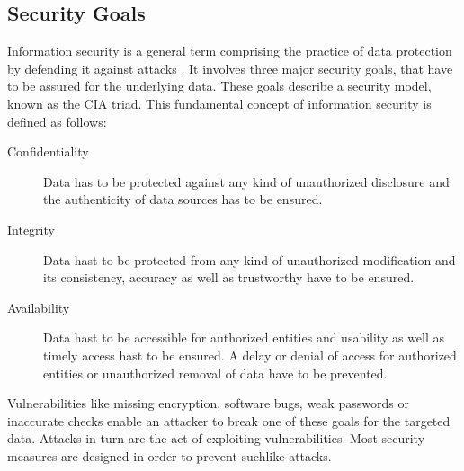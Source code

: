 \subsection{Security Goals}
Information security is a general term comprising the practice of data protection by defending it against attacks \cite{olivier2002database,Perrin:2008}. It involves three major security goals, that have to be assured for the underlying data. These goals describe a security model, known as the CIA triad. This fundamental concept of information security is defined as follows:

\begin{description}
\item [Confidentiality] Data has to be protected against any kind of unauthorized disclosure and the authenticity of data sources has to be ensured.
\item [Integrity] Data hast to be protected from any kind of unauthorized modification and its consistency, accuracy as well as trustworthy have to be ensured.
\item [Availability] Data hast to be accessible for authorized entities and usability as well as timely access hast to be ensured. A delay or denial of access for authorized entities or unauthorized removal of data have to be prevented.
\end{description}

Vulnerabilities like missing encryption, software bugs, weak passwords or inaccurate checks enable an attacker to break one of these goals for the targeted data. Attacks in turn are the act of exploiting vulnerabilities. Most security measures are designed in order to prevent suchlike attacks.

